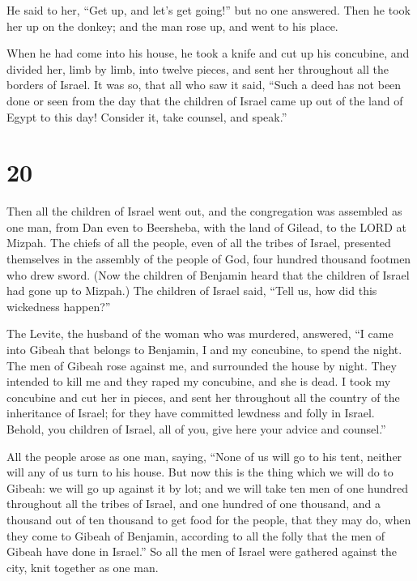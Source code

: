  He said to her, ``Get up, and let's get going!'' but no
one answered. Then he took her up on the donkey; and the man rose up,
and went to his place.

 When he had come into his house, he took a knife and cut
up his concubine, and divided her, limb by limb, into twelve pieces, and
sent her throughout all the borders of Israel.  It was
so, that all who saw it said, ``Such a deed has not been done or seen
from the day that the children of Israel came up out of the land of
Egypt to this day! Consider it, take counsel, and speak.''

\hypertarget{section-19}{%
\section{20}\label{section-19}}

 Then all the children of Israel went out, and the
congregation was assembled as one man, from Dan even to Beersheba, with
the land of Gilead, to the LORD at Mizpah.  The chiefs of
all the people, even of all the tribes of Israel, presented themselves
in the assembly of the people of God, four hundred thousand footmen who
drew sword.  (Now the children of Benjamin heard that the
children of Israel had gone up to Mizpah.) The children of Israel said,
``Tell us, how did this wickedness happen?''

 The Levite, the husband of the woman who was murdered,
answered, ``I came into Gibeah that belongs to Benjamin, I and my
concubine, to spend the night.  The men of Gibeah rose
against me, and surrounded the house by night. They intended to kill me
and they raped my concubine, and she is dead.  I took my
concubine and cut her in pieces, and sent her throughout all the country
of the inheritance of Israel; for they have committed lewdness and folly
in Israel.  Behold, you children of Israel, all of you,
give here your advice and counsel.''

 All the people arose as one man, saying, ``None of us
will go to his tent, neither will any of us turn to his house.
 But now this is the thing which we will do to Gibeah: we
will go up against it by lot;  and we will take ten men
of one hundred throughout all the tribes of Israel, and one hundred of
one thousand, and a thousand out of ten thousand to get food for the
people, that they may do, when they come to Gibeah of Benjamin,
according to all the folly that the men of Gibeah have done in Israel.''
 So all the men of Israel were gathered against the city,
knit together as one man.

